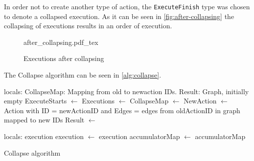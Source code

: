 	In order not to create another type of action, the \texttt{ExecuteFinish} type was chosen to denote a collapsed execution. As it can be seen in \autoref{fig:after-collapsing} the collapsing of executions results in an order of execution.
	
	\begin{figure}
		\centering
		\def\svgwidth{0.22\columnwidth}
		\fontsize{6}{8}\selectfont
		{after_collapsing.pdf_tex}
		\caption{Executions after collapsing}
		\label{fig:after-collapsing}
	\end{figure}
	
	The Collapse algorithm can be seen in \autoref{alg:collapse}.
	
	\begin{algorithm}
		\begin{algorithmic}
			\State
				locals: CollapseMap: Mapping from old to newaction IDs.
				\State\hspace{28pt} Result: Graph, initially empty
				\State
				\State ExecuteStarts $\leftarrow$  \State
				Executions $\leftarrow$ 
				\State
					CollapseMap $\leftarrow$ 
				\EndFor
					\State
					NewAction $\leftarrow$ Action with \State\hspace{28pt}ID = newActionID and \State\hspace{28pt}Edges = edges from oldActionID in graph mapped to new IDs\State
					Result $\leftarrow$  \State{}
				\EndFor
				
			\EndFunction
			\State
				\State locals: execution
				 \State
					execution $\leftarrow$ 
				\EndWhile\State
				\Return execution
			\EndFunction
			\State
				\State
					accumulatorMap $\leftarrow$ 
				\EndFor \State
				\Return accumulatorMap
			\EndFunction
		\end{algorithmic}
		\caption{Collapse algorithm}
		\label{alg:collapse}
	\end{algorithm}
	
